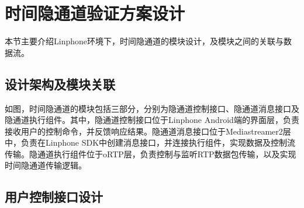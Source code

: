 \section{时间隐通道验证方案设计}
\label{chap:linphone:designation}

本节主要介绍Linphone环境下，时间隐通道的模块设计，及模块之间的关联与数据流。

\subsection{设计架构及模块关联}
\label{chap:linphone:designation:struct}


如图，时间隐通道的模块包括三部分，分别为隐通道控制接口、隐通道消息接口及隐通道执行组件。其中，隐通道控制接口位于Linphone Android端的界面层，负责接收用户的控制命令，并反馈响应结果。隐通道消息接口位于Mediastreamer2层中，负责在Linphone SDK中创建消息接口，并连接执行组件，实现数据及控制流传输。隐通道执行组件位于oRTP层，负责控制与监听RTP数据包传输，以及实现时间隐通道传输逻辑。

\subsection{用户控制接口设计}
\label{chap:linphone:designation:ui}

